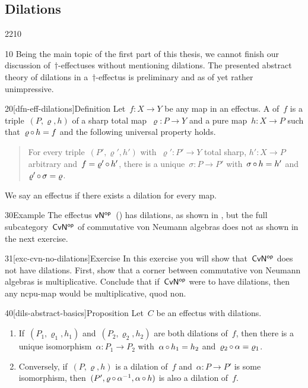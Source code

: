 \subsection{Dilations}
\begin{parsec}{2210}%
\begin{point}{10}%
Being the main topic of the first part of this thesis,
    we cannot finish our discussion of~$\dagger$-effectuses
    without mentioning dilations.
The presented abstract theory of dilations in a~$\dagger$-effectus
    is preliminary and as of yet rather unimpressive.
\end{point}
\begin{point}{20}[dfn-eff-dilations]{Definition}%
Let~$f\colon X \to Y$ be any map in an effectus.
    A  of~$f$ 
    is a triple~$(P, \varrho, h)$
    of a sharp total map~$\varrho \colon P \to Y$
    and a pure map~$h \colon X \to P$
    such that~$\varrho \mathop{\circ} h = f$
        and the following universal property holds.
\begin{quote}
    For every  triple~$(P', \varrho', h')$
    with~$\varrho'\colon P' \to Y$ total sharp,
    $h'\colon X \to P$ arbitrary and~$f = \varrho'\mathop{\circ} h'$,
    there is a unique~$\sigma \colon P \to P'$
    with~$\sigma \mathop{\circ} h = h'$
    and~$\varrho' \mathop{\circ} \sigma = \varrho$.
\end{quote}
    We say an effectus  if 
    there exists a dilation for every map.
\end{point}
\begin{point}{30}{Example}%
    The effectus ${\mathsf{vN}}{^{\mathsf{op}}}$~() has dilations,
    as shown in ,
    but the full subcategory~${\mathsf{CvN}}{^{\mathsf{op}}}$
    of commutative von Neumann algebras
    does not as shown in the next exercise.
\end{point}
\begin{point}{31}[exc-cvn-no-dilations]{Exercise}%
In this exercise you will show that~${\mathsf{CvN}}{^{\mathsf{op}}}$
    does not have dilations.
First, show that a corner between commutative von Neumann algebras
    is multiplicative.
Conclude that if~${\mathsf{CvN}}{^{\mathsf{op}}}$ were to have dilations,
    then any ncpu-map would be multiplicative, quod non.
\end{point}
\begin{point}{40}[dils-abstract-basics]{Proposition}%
Let~$C$ be an effectus with dilations.
\begin{enumerate}
\item
    If~$(P_1,\varrho_1,h_1)$
    and~$(P_2,\varrho_2,h_2)$
        are both dilations of~$f$,
    then there is a unique isomorphism~$\alpha\colon P_1 \to P_2$
        with~$\alpha \mathop{\circ} h_1 = h_2$ and~$\varrho_2 \mathop{\circ} \alpha = \varrho_1$.
\item
    Conversely,
    if~$(P,\varrho,h)$
        is a dilation of~$f$ and~$\alpha\colon P \to P'$ is some isomorphism,
        then~$(P', \varrho \mathop{\circ} \alpha^{-1}, \alpha \mathop{\circ} h)$
        is also a dilation of~$f$.


\end{enumerate}
\end{point}
\end{parsec}
